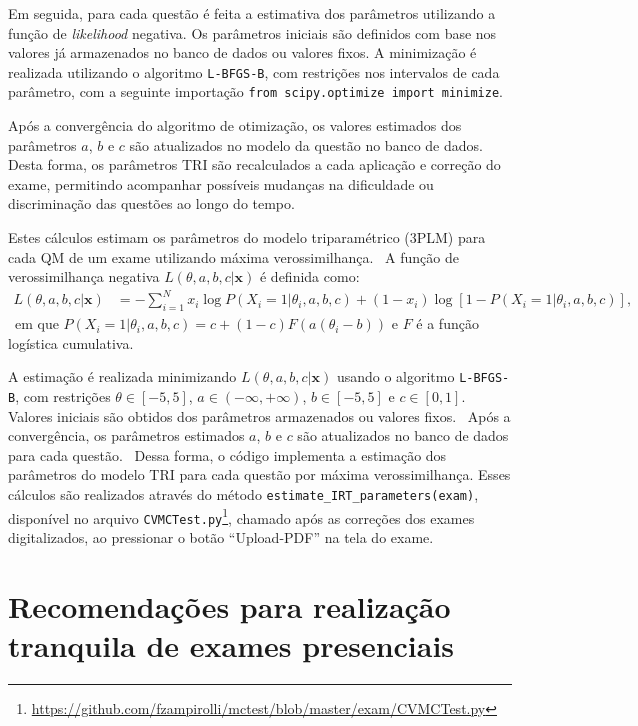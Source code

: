 Em seguida, para cada questão é feita a estimativa dos parâmetros utilizando a função de \textit{likelihood} negativa. Os parâmetros iniciais são definidos com base nos valores já armazenados no banco de dados ou valores fixos. A minimização é realizada utilizando o algoritmo \verb|L-BFGS-B|, com restrições nos intervalos de cada parâmetro, com a seguinte importação \verb|from scipy.optimize import minimize|.

Após a convergência do algoritmo de otimização, os valores estimados dos parâmetros $a$, $b$ e $c$  são atualizados no modelo da questão no banco de dados. Desta forma, os parâmetros TRI são recalculados a cada aplicação e correção do exame, permitindo acompanhar possíveis mudanças na dificuldade ou discriminação das questões ao longo do tempo.

Estes cálculos estimam os parâmetros do modelo triparamétrico (3PLM) para cada QM de um exame utilizando máxima verossimilhança.
\
A função de verossimilhança negativa $L(\theta,a,b,c|\mathbf{x})$ é definida como:
\
\begin{align*}
L(\theta,a,b,c|\mathbf{x}) &= -\sum_{i=1}^N x_i \log P(X_i=1|\theta_i, a,b,c) + (1-x_i)\log[1-P(X_i=1|\theta_i, a,b,c)],
\end{align*}
\
em que $P(X_i=1|\theta_i, a,b,c) = c + (1-c)F(a(\theta_i - b))$ e $F$ é a função logística cumulativa.

A estimação é realizada minimizando $L(\theta,a,b,c|\mathbf{x})$ usando o algoritmo \verb|L-BFGS-B|, com restrições $\theta\in[-5,5]$, $a\in(-\infty,+\infty)$, $b\in[-5,5]$ e $c\in[0,1]$. Valores iniciais são obtidos dos parâmetros armazenados ou valores fixos.
\
Após a convergência, os parâmetros estimados $a$, $b$ e $c$ são atualizados no banco de dados para cada questão.
\
Dessa forma, o código implementa a estimação dos parâmetros do modelo TRI para cada questão por máxima verossimilhança. Esses cálculos são realizados através do método \verb|estimate_IRT_parameters(exam)|, disponível no arquivo \verb|CVMCTest.py|\footnote{\url{https://github.com/fzampirolli/mctest/blob/master/exam/CVMCTest.py}}, chamado após as correções dos exames digitalizados, ao pressionar o botão ``Upload-PDF'' na tela do exame.






\section{Recomendações para realização tranquila de exames presenciais}\label{sec:recomendacoesCap8}

